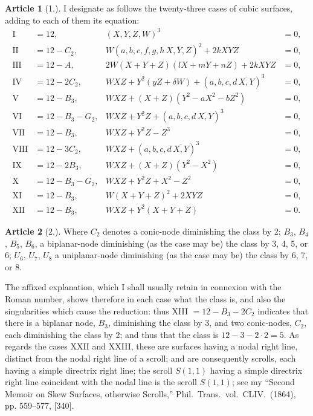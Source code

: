 \documentclass[11pt,a4paper]{article}
\theoremstyle{definition}
\newtheorem{art}{Article}
\begin{document}
\begin{art}[1.]
I designate as follows the twenty-three cases of cubic surfaces, adding to each of them its equation:
\begin{align*}
\text{I} &= 12, & (X, Y, Z, W)^3 &= 0, \\
\text{II} &= 12 - C_2, & W(a,b,c,f,g,h\,\overline{\!\!X,Y,Z\!\!})^2 + 2kXYZ &= 0, \\
\text{III} &= 12 - A, & 2W(X+Y+Z)(lX+mY+nZ) + 2kXYZ &= 0, \\
\text{IV} &= 12 - 2C_2, & WXZ + Y^2(yZ + \delta W) + (a,b,c,d\,\overline{\!\!X,Y\!\!})^3 &= 0, \\
\text{V} &= 12 - B_3, & WXZ + (X+Z)(Y^2 - aX^2 - bZ^2) &= 0, \\
\text{VI} &= 12 - B_3 - G_2, & WXZ + Y^2Z + (a,b,c,d\,\overline{\!\!X,Y\!\!})^3 &= 0, \\
\text{VII} &= 12 - B_3, & WXZ + Y^2Z - Z^3 &= 0, \\
\text{VIII} &= 12 - 3C_2, & WXZ + (a,b,c,d\,\overline{\!\!X,Y\!\!})^3 &= 0, \\
\text{IX} &= 12 - 2B_3, & WXZ + (X+Z)(Y^2 - X^2) &= 0, \\
\text{X} &= 12 - B_3 - G_2, & WXZ + Y^2Z + X^2 - Z^2 &= 0, \\
\text{XI} &= 12 - B_3, & W(X+Y+Z)^2 + 2XYZ &= 0, \\
\text{XII} &= 12 - B_3, & WXZ + Y^2(X+Y+Z) &= 0.
\end{align*}
\end{art}



\newpage
\setcounter{page}{360}

\begin{art}[2.]
Where $C_2$ denotes a conic-node diminishing the class by 2; $B_3$, $B_4$, $B_5$, $B_6$, a biplanar-node diminishing (as the case may be) the class by 3, 4, 5, or 6; $U_6$, $U_7$, $U_8$ a uniplanar-node diminishing (as the case may be) the class by 6, 7, or 8.

The affixed explanation, which I shall usually retain in connexion with the Roman number, shows therefore in each case what the class is, and also the singularities which cause the reduction: thus XIII $= 12 - B_3 - 2C_2$ indicates that there is a biplanar node, $B_3$, diminishing the class by 3, and two conic-nodes, $C_2$, each diminishing the class by 2; and thus that the class is $12 - 3 - 2 \cdot 2 = 5$. As regards the cases XXII and XXIII, these are surfaces having a nodal right line, distinct from the nodal right line of a scroll; and are consequently scrolls, each having a simple directrix right line; the scroll $S(1,1)$ having a simple directrix right line coincident with the nodal line is the scroll $S(1,1)$; see my ``Second Memoir on Skew Surfaces, otherwise Scrolls,'' Phil.\ Trans.\ vol.\ CLIV.\ (1864), pp. 559--577, [340].
\end{art}
\end{document}
